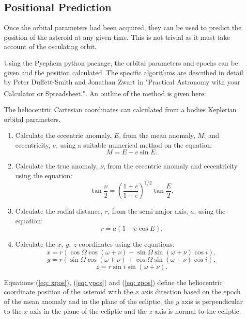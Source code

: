 \documentclass[10pt, twocolumn]{revtex4}    %
\begin{document}
\subsection*{Positional Prediction}

Once the orbital parameters had been acquired, they can be used to predict the position of the asteroid at any given time. This is not trivial as it must take account of the osculating orbit.

Using the Pyephem python package, the orbital parameters and epochs can be given and the position calculated. The specific algorithms are described in detail by Peter Duffett-Smith and Jonathan Zwart in "Practical Astronomy with your Calculator or Spreadsheet."\textsuperscript{\cite[p.121-130]{Duffett-SmithPracticalastronomyyour2011}}. An outline of the method is given here:

\vspace{1ex}
The heliocentric Cartesian coordinates can calculated from a bodies Keplerian orbital parameters.
\begin{enumerate}
\item Calculate the eccentric anomaly, $E$, from the mean anomaly, $M$, and eccentricity, $e$, using a suitable numerical method on the equation:
\begin{equation}
M = E - e \sin E .
\end{equation}
\item Calculate the true anomaly, $\nu$, from the eccentric anomaly and eccentricity using the equation:
\begin{equation}
\tan \frac{\nu}{2} = \left(\frac{1+e}{1-e} \right)^{1/2} \tan \frac{E}{2} .
\end{equation}
\item Calculate the radial distance, $r$, from the semi-major axis, $a$, using the equation:
\begin{equation}
r = a(1-e\cos E) .
\end{equation}
\item Calculate the $x,\ y,\ z$ coordinates using the equations:
\begin{equation} \label{eq: xpos}
x = r(\cos\Omega\cos(\omega+\nu) - \sin\Omega\sin(\omega+\nu)\cos i) ,
\end{equation}
\begin{equation} \label{eq: ypos}
y = r(\sin\Omega\cos(\omega+\nu) + \cos\Omega\sin(\omega+\nu)\cos i) ,
\end{equation}
\begin{equation} \label{eq: zpos}
z = r\sin i \sin(\omega+\nu) .
\end{equation}
\end{enumerate}
Equations (\ref{eq: xpos}), (\ref{eq: ypos}) and (\ref{eq: zpos}) define the heliocentric coordinate position of the asteroid with the $x$ axis direction based on the epoch of the mean anomaly and in the plane of the ecliptic, the $y$ axis is perpendicular to the $x$ axis in the plane of the ecliptic and the $z$ axis is normal to the ecliptic.
\vspace{1ex}
\end{document}

